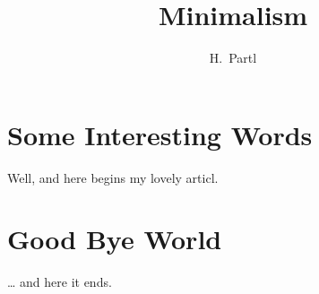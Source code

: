 \documentclass[a4papter, 11pt]{article}
\author{H.~Partl}
\title{Minimalism}
\begin{document}
\maketitle
\tableofcontents
\section{Some Interesting Words}
Well, and here begins my lovely articl.
\section{Good Bye World}
\ldots{} and here it ends.
\end{document}
